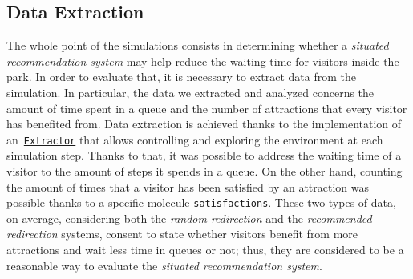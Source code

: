 \subsection{Data Extraction}\label{subsec:data-extraction}
The whole point of the simulations consists in determining whether a \textit{situated recommendation system} may help reduce the waiting time for visitors inside the park.
In order to evaluate that, it is necessary to extract data from the simulation.
In particular, the data we extracted and analyzed concerns the amount of time spent in a queue and the number of attractions that every visitor has benefited from.
Data extraction is achieved thanks to the implementation of an~\href{https://alchemistsimulator.github.io/reference/kdoc/alchemist/it.unibo.alchemist.loader.export/-extractor/index.html}{\texttt{Extractor}} that allows controlling and exploring the environment at each simulation step.
Thanks to that, it was possible to address the waiting time of a visitor to the amount of steps it spends in a queue.
On the other hand, counting the amount of times that a visitor has been satisfied by an attraction was possible thanks to a specific molecule \texttt{satisfactions}.
These two types of data, on average, considering both the \textit{random redirection} and the \textit{recommended redirection} systems, consent to state whether visitors benefit from more attractions and wait less time in queues or not;
thus, they are considered to be a reasonable way to evaluate the \textit{situated recommendation system}.

